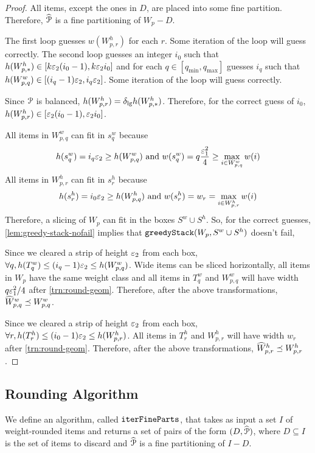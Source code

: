 \rthmPartWide*
\begin{proof}
All items, except the ones in $D$, are placed into some fine partition.
Therefore, $\widehat{\mathcal{P}}$ is a fine partitioning of $W_p - D$.

The first loop guesses $w(W^h_{p,r})$ for each $r$.
Some iteration of the loop will guess correctly.
The second loop guesses an integer $i_0$ such that
$h(W^h_{p,*}) \in [k\varepsilon_2(i_0-1), k\varepsilon_2 i_0]$
and for each $q \in [q_{\min}, q_{\max}]$ guesses $i_q$ such that
$h(W^w_{p,q}) \in [(i_q-1)\varepsilon_2, i_q\varepsilon_2]$.
Some iteration of the loop will guess correctly.

Since $\mathcal{P}$ is balanced, $h(W^h_{p,r}) = \delta_{\mathrm{lg}} h(W^h_{p,*})$.
Therefore, for the correct guess of $i_0$,
$h(W^h_{p,r}) \in [\varepsilon_2(i_0-1), \varepsilon_2 i_0]$.

All items in $W^w_{p,q}$ can fit in $s^w_q$ because
\[ h(s^w_q) = i_q\varepsilon_2 \ge h(W^w_{p,q}) \textrm{ and }
w(s^w_q) = q\frac{\varepsilon_1^2}{4} \ge \max_{i \in W^w_{p,q}} w(i) \]
All items in $W^h_{p,r}$ can fit in $s^h_r$ because
\[ h(s^h_r) = i_0\varepsilon_2 \ge h(W^h_{p,q}) \textrm{ and }
w(s^h_r) = w_r = \max_{i \in W^h_{p,r}} w(i) \]
Therefore, a slicing of $W_p$ can fit in the boxes $S^w \cup S^h$.
So, for the correct guesses, \cref{lem:greedy-stack-nofail} implies that
$\operatorname{\mathtt{greedyStack}}(W_p, S^w \cup S^h)$ doesn't fail,

Since we cleared a strip of height $\varepsilon_2$ from each box,
$\forall q, h(T^w_q) \le (i_q-1)\varepsilon_2 \le h(W^w_{p,q})$.
Wide items can be sliced horizontally, all items in $W_p$ have the same weight class
and all items in $T^w_q$ and $W^w_{p,q}$
will have width $q\varepsilon_1^2/4$ after \cref{trn:round-geom}.
Therefore, after the above transformations, $\widehat{W}^w_{p,q} \preceq W^w_{p,q}$.

Since we cleared a strip of height $\varepsilon_2$ from each box,
$\forall r, h(T^h_r) \le (i_0-1)\varepsilon_2 \le h(W^h_{p,r})$. All items in $T^h_r$
and $W^h_{p,r}$ will have width $w_r$ after \cref{trn:round-geom}.
Therefore, after the above transformations, $\widehat{W}^h_{p,r} \preceq W^h_{p,r}$.
\end{proof}

\rthmPartWideTime*

\subsection{Rounding Algorithm}

We define an algorithm, called $\operatorname{\mathtt{iterFineParts}}$, that takes as input a set $I$ of
weight-rounded items and returns a set of pairs of the form $(D, \widehat{\mathcal{P}})$,
where $D \subseteq I$ is the set of items to discard
and $\widehat{\mathcal{P}}$ is a fine partitioning of $I-D$.

